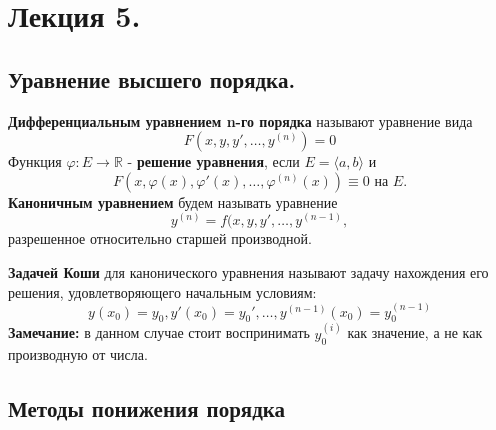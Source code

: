 \section{Лекция 5.}

\subsection{Уравнение высшего порядка.}


 \textbf{Дифференциальным уравнением n-го порядка} называют уравнение вида
$$F(x,y,y', \dots,y^{(n)})=0$$ %
  Функция $\varphi:E  \to  \mathbb{R}$  
- \textbf{решение  уравнения},  если  $E    =    \langle a,b \rangle$ и 
$$F(x, \varphi(x), \varphi'(x),\dots,\varphi^{(n)}(x)) \equiv 0 \text{  на  } E.$$
 \textbf{Каноничным уравнением} будем называть уравнение 
$$y^{(n)} =   f(x,y,y',\dots,y^{(n-1)},$$
разрешенное относительно старшей производной.



 \textbf{Задачей Коши} для канонического уравнения называют задачу нахождения его решения, удовлетворяющего начальным условиям:
$$y(x_0) = y_0, y'(x_0) = y_0', \ldots, y^{(n-1)}(x_0) = y_0^{(n-1)} $$
\textbf{Замечание:} в данном случае стоит воспринимать $y_0^{(i)}$ как значение, а не как производную от числа.


\subsection{Методы понижения порядка}

